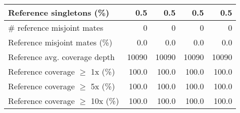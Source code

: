 \documentclass[12pt,a4paper]{article}
\begin{document}
\begin{table}[ht]
\begin{center}
\begin{tabular}{|l*{4}{|r}|}
Reference singletons (\%) & 0.5 & 0.5 & 0.5 & 0.5 \\ \hline
\# reference misjoint mates & 0 & 0 & 0 & 0 \\ \hline
Reference misjoint mates (\%) & 0.0 & 0.0 & 0.0 & 0.0 \\ \hline
Reference avg. coverage depth & 10090 & 10090 & 10090 & 10090 \\ \hline
Reference coverage $\geq$ 1x (\%) & 100.0 & 100.0 & 100.0 & 100.0 \\ \hline
Reference coverage $\geq$ 5x (\%) & 100.0 & 100.0 & 100.0 & 100.0 \\ \hline
Reference coverage $\geq$ 10x (\%) & 100.0 & 100.0 & 100.0 & 100.0 \\ \hline
\end{tabular}
\end{center}
\end{table}
\end{document}
